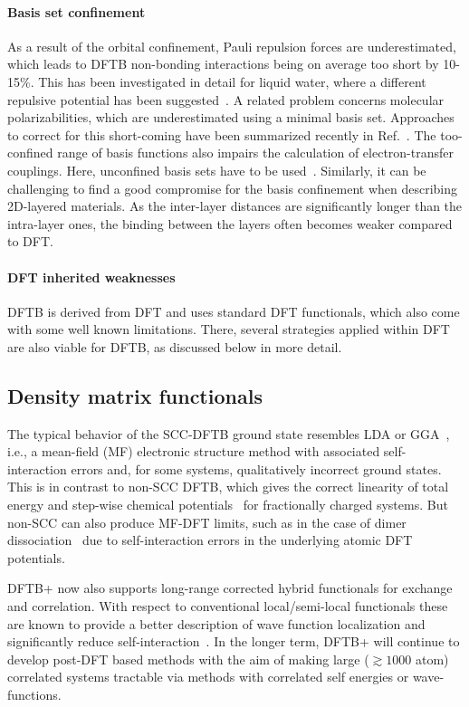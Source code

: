 \documentclass[reprint,onecolumn,superscriptaddress]{revtex4-1}
\newcommand{\dftbp}{DFTB+}
\begin{document}
\paragraph{Basis set confinement} As a result of the orbital confinement, Pauli
repulsion forces are underestimated, which leads to DFTB non-bonding
interactions being on average too short by 10-15$\%$. This has been investigated
in detail for liquid water, where a different repulsive potential has been
suggested~\cite{Goyal2014}. A related problem concerns molecular
polarizabilities, which are underestimated using a minimal basis set. Approaches
to correct for this short-coming have been summarized recently in
Ref.~\cite{Christensen2016}. The too-confined range of basis functions
also impairs the calculation of electron-transfer couplings. Here, unconfined
basis sets have to be used~\cite{Kubas2014}. Similarly, it can be challenging to
find a good compromise for the basis confinement when describing 2D-layered
materials. As the inter-layer distances are significantly longer than the
intra-layer ones, the binding between the layers often becomes weaker compared
to DFT.

\paragraph{DFT inherited weaknesses} DFTB is derived from DFT and uses standard
DFT functionals, which also come with some well known limitations. There,
several strategies applied within DFT are also viable for DFTB, as discussed
below in more detail.


\subsection{Density matrix functionals}

The typical behavior of the SCC-DFTB ground state resembles LDA or
GGA~\cite{hourahine07}, i.e., a mean-field (MF) electronic structure method with
associated self-interaction errors and, for some systems, qualitatively
incorrect ground states. This is in contrast to non-SCC DFTB, which gives the
correct linearity of total energy and step-wise chemical
potentials~\cite{PhysRevLett.49.1691} for fractionally charged systems. But
non-SCC can also produce MF-DFT limits, such as in the case of dimer
dissociation~\cite{Rapacioli2011,Irle2012} due to self-interaction errors in the
underlying atomic DFT potentials.

\dftbp{} now also supports long-range corrected hybrid functionals for exchange
and correlation. With respect to conventional local/semi-local functionals these
are known to provide a better description of wave function localization and
significantly reduce self-interaction~\cite{Baer2010}. In the longer term,
\dftbp{} will continue to develop post-DFT based methods with the aim of making
large ($\gtrsim 1000$ atom) correlated systems tractable via methods with
correlated self energies or wave-functions.
\end{document}
